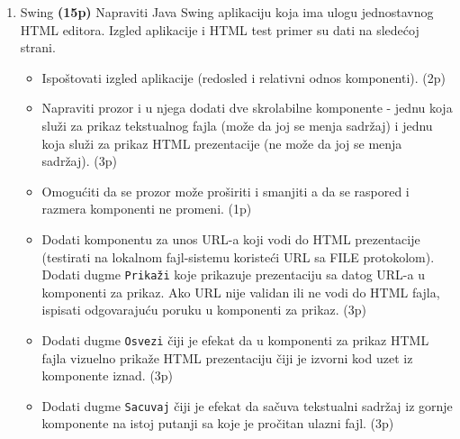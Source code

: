 \documentclass[]{article}
\begin{document}
\begin{enumerate}
  \item Swing \textbf{(15p)}
  Napraviti Java Swing aplikaciju koja ima ulogu jednostavnog HTML editora. Izgled aplikacije i HTML test primer su dati na slede\'c{}oj strani.
  \begin{itemize}
    \item Ispo\v{s}tovati izgled aplikacije (redosled i relativni odnos komponenti). \hfill (2p)
    \item Napraviti prozor i u njega dodati dve skrolabilne komponente - jednu koja slu\v{z}i za prikaz tekstualnog fajla (mo\v{z}e da joj se menja sadr\v{z}aj) i jednu koja slu\v{z}i za prikaz HTML prezentacije (ne mo\v{z}e da joj se menja sadr\v{z}aj). \hfill (3p)
    \item Omogu\'c{}iti da se prozor mo\v{z}e pro\v{s}iriti i smanjiti a da se raspored i razmera komponenti ne promeni. \hfill (1p)
    \item Dodati komponentu za unos URL-a koji vodi do HTML prezentacije (testirati na lokalnom fajl-sistemu koriste\'c{}i URL sa FILE protokolom). Dodati dugme \texttt{Prika\v{z}i} koje prikazuje prezentaciju sa datog URL-a u komponenti za prikaz. Ako URL nije validan ili ne vodi do HTML fajla, ispisati odgovaraju\'c{}u poruku u komponenti za prikaz. \hfill (3p)
    \item Dodati dugme \texttt{Osvezi} \v{c}iji je efekat da u komponenti za prikaz HTML fajla vizuelno prika\v{z}e HTML prezentaciju \v{c}iji je izvorni kod uzet iz komponente iznad. \hfill (3p)
    \item Dodati dugme \texttt{Sacuvaj} \v{c}iji je efekat da sa\v{c}uva tekstualni sadr\v{z}aj iz gornje komponente na istoj putanji sa koje je pro\v{c}itan ulazni fajl. \hfill (3p)
  \end{itemize}

\end{enumerate}


\newpage
\end{document}
